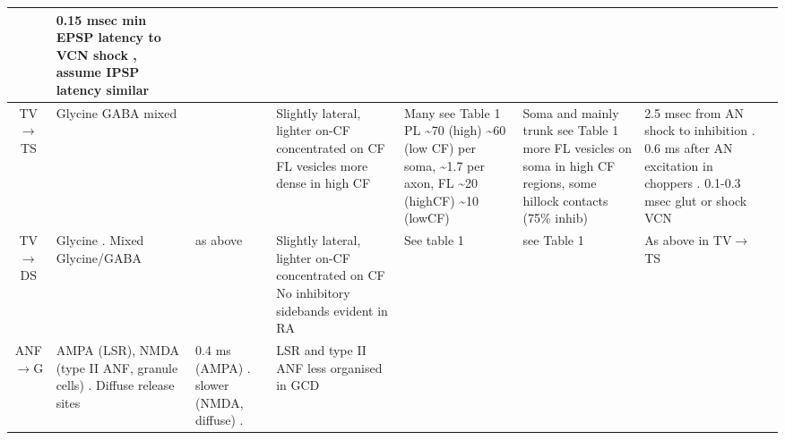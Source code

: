 \begin{longtable}{cXXXXXXX}
& 
0.15 msec min EPSP latency to VCN shock , assume IPSP latency similar
\citep{ZhangOertel:1993}\\ \midrule
TV\ensuremath{\rightarrow}TS                        
& %
Glycine\citep{OertelWickesberg:1993,OstapoffMorestEtAl:1999,SaintBensonEtAl:1991,WickesbergOertel:1993}
                GABA mixed \citep{OsenOttersenEtAl:1990}                  
& %
   \citep{HartyManis:1998,OertelWickesberg:1993,WickesbergOertel:1993}    
& %
Slightly lateral, lighter on-CF \citep{OstapoffMorestEtAl:1999} concentrated
on CF \citep{ZhangOertel:1993} FL vesicles more dense in high CF
                      \citep{JosephsonMorest:1998}                        
& %
Many \citep{OstapoffMorestEtAl:1999} see
Table 1 \citep{SmithRhode:1989} PL \~{}70 (high) \~{}60 (low CF) per soma,
\~{}1.7 per axon, FL \~{}20 (highCF) \~{}10 (lowCF)
                      \citep{JosephsonMorest:1998}                        
& %
Soma and mainly trunk
\citep{AltschulerJuizEtAl:1993} 
see Table 1\citep{SmithRhode:1989} 
more FL vesicles on soma in high CF regions, some hillock contacts (75\% inhib) \citep{JosephsonMorest:1998}                        
& %
2.5 msec from AN shock to inhibition \citep{WickesbergOertel:1993}. 
0.6 ms after AN excitation in choppers \citep{Wickesberg:1996}. 
0.1-0.3 msec glut or shock VCN \citep{ZhangOertel:1993}
\\ \midrule
TV\ensuremath{\rightarrow}DS                        
&  %
Glycine \citep{OstapoffMorestEtAl:1999,SaintBensonEtAl:1991}. 
Mixed  Glycine/GABA \citep{OsenOttersenEtAl:1990}                 
& %
\citep{OstapoffMorestEtAl:1999}
                                as above                                  
& Slightly lateral, lighter on-CF \citep{OstapoffMorestEtAl:1999}
concentrated on CF \citep{ZhangOertel:1993} No inhibitory sidebands evident in RA                                   
&    See table 1 \citep{SmithRhode:1989}     
& see Table 1 \citep{SmithRhode:1989}                          
& 
As above in TV\ensuremath{\rightarrow}TS
\\ \midrule
ANF\ensuremath{\rightarrow}G                      
& %
AMPA (LSR), NMDA (type II ANF, granule cells)
\citep{Cant:1992,FerragamoGoldingEtAl:1998a,RyugoWrightEtAl:1993,Ryugo:1992,RyugoParks:2003}.
Diffuse release sites \citep{HurdHutsonEtAl:1999}             
& %
0.4 ms (AMPA)   \citep{GardnerTrussellEtAl:1999}. 
slower (NMDA, diffuse) \citep{HurdHutsonEtAl:1999}.    
& %
LSR and type II ANF less organised in GCD \citep{WeedmanPongstapornEtAl:1996,RyugoWrigthEtAl:1993}

\end{longtable}
